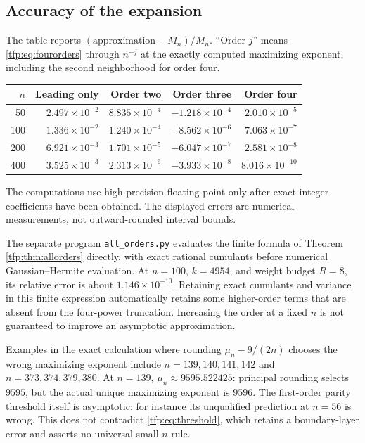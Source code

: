 \documentclass[11pt,a4paper]{article}
\numberwithin{equation}{section}
\theoremstyle{definition}\newtheorem{definition}[theorem]{Definition}
\theoremstyle{remark}\newtheorem{remark}[theorem]{Remark}
\begin{document}
\subsection{Accuracy of the expansion}
The table reports $(\text{approximation}-M_n)/M_n$. ``Order $j$'' means
\eqref{tfp:eq:fourorders} through $n^{-j}$ at the exactly computed maximizing
exponent, including the second neighborhood for order four.
\begin{center}
\small
\begin{tabular}{r r r r r}
\toprule
$n$ & Leading only & Order two & Order three & Order four\\
\midrule
50  & $2.497\!\times10^{-2}$ & $8.835\!\times10^{-4}$ & $-1.218\!\times10^{-4}$ & $2.010\!\times10^{-5}$\\
100 & $1.336\!\times10^{-2}$ & $1.240\!\times10^{-4}$ & $-8.562\!\times10^{-6}$ & $7.063\!\times10^{-7}$\\
200 & $6.921\!\times10^{-3}$ & $1.701\!\times10^{-5}$ & $-6.047\!\times10^{-7}$ & $2.581\!\times10^{-8}$\\
400 & $3.525\!\times10^{-3}$ & $2.313\!\times10^{-6}$ & $-3.933\!\times10^{-8}$ & $8.016\!\times10^{-10}$\\
\bottomrule
\end{tabular}
\end{center}
The computations use high-precision floating point only after exact
integer coefficients have been obtained. The displayed errors are
numerical measurements, not outward-rounded interval bounds.

The separate program \texttt{all\_orders.py} evaluates the finite
formula of Theorem \ref{tfp:thm:allorders} directly, with exact rational
cumulants before numerical Gaussian--Hermite evaluation. At $n=100$,
$k=4954$, and weight budget $R=8$, its relative error is about
$1.146\times10^{-10}$. Retaining exact cumulants and variance in this
finite expression automatically retains some higher-order terms that
are absent from the four-power truncation. Increasing the order at a
fixed $n$ is not guaranteed to improve an asymptotic approximation.

Examples in the exact calculation where rounding
$\mu_n-9/(2n)$ chooses the wrong maximizing exponent include
$n=139,140,141,142$ and $n=373,374,379,380$. At $n=139$,
$\mu_n\approx9595.522425$: principal rounding selects $9595$, but the
actual unique maximizing exponent is $9596$.
The first-order parity threshold itself is asymptotic: for instance its
unqualified prediction at $n=56$ is wrong. This does not contradict
\eqref{tfp:eq:threshold}, which retains a boundary-layer error and asserts
no universal small-$n$ rule.
\end{document}
